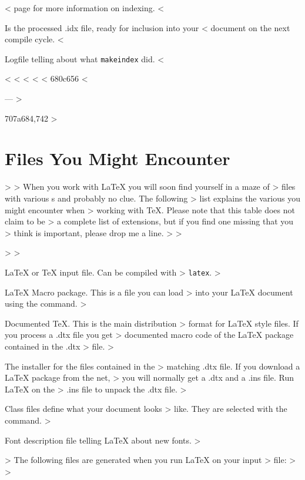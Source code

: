 \begin{lined}{12cm}
\begin{lined}{\textwidth}
\begin{lined}{12cm}
\begin{lined}{\textwidth}
\begin{table}[!hbp]
\begin{table}[btp]
\begin{lined}{11cm}
\begin{lined}{\textwidth}
\begin{description}
<   page \pageref{sec:indexing} for more information on indexing.
< \item[\wi{.ind}] Is the processed .idx file, ready for inclusion into your
<   document on the next compile cycle.
< \item[\wi{.ilg}] Logfile telling about what \texttt{makeindex} did.
< \end{description}
< 
< 
< %
< %
< %
680c656
< \begin{lined}{12cm}
---
> \begin{lined}{\textwidth}
707a684,742
> \section{Files You Might Encounter}
> 
> When you work with \LaTeX{} you will soon find yourself in a maze of
> files with various s and probably no clue. The following
> list explains the various  you might encounter when
> working with \TeX{}. Please note that this table does not claim to be
> a complete list of extensions, but if you find one missing that you
> think is important, please drop me a line.
> 
> \begin{description}
>   
> \item[\eei{.tex}] \LaTeX{} or \TeX{} input file. Can be compiled with
>   \texttt{latex}.
> \item[\eei{.sty}] \LaTeX{} Macro package. This is a file you can load
>   into your \LaTeX{} document using the  command.
> \item[\eei{.dtx}] Documented \TeX{}. This is the main distribution
>   format for \LaTeX{} style files. If you process a .dtx file you get
>   documented macro code of the \LaTeX{} package contained in the .dtx
>   file.
> \item[\eei{.ins}] The installer for the files contained in the
>   matching .dtx file. If you download a \LaTeX{} package from the net,
>   you will normally get a .dtx and a .ins file. Run \LaTeX{} on the
>   .ins file to unpack the .dtx file.
> \item[\eei{.cls}] Class files define what your document looks
>   like. They are selected with the  command.
> \item[\eei{.fd}] Font description file telling  \LaTeX{} about new fonts.
> \end{description}
> The following files are generated when you run \LaTeX{} on your input
> file:
> 
> \begin{description}

\end{description}
\end{lined}
\end{lined}
\end{lined}
\end{lined}
\end{table}
\end{table}
\end{lined}
\end{lined}
\end{lined}
\end{lined}
